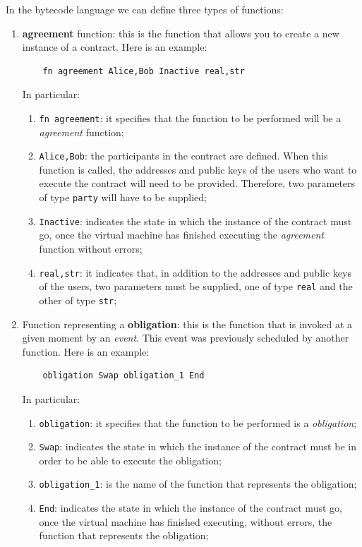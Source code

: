 In the bytecode language we can define three types of functions:
\begin{enumerate}
  \item \textbf{agreement} function: this is the function that allows you to create a new instance of a 
  contract. Here is an example:

  \begin{Verbatim}
    fn agreement Alice,Bob Inactive real,str
  \end{Verbatim}

  In particular:
  \begin{enumerate}
    \item \verb|fn agreement|: it specifies that the function to be performed will be a 
    \textit{agreement} function;
    \item \verb|Alice,Bob|: the participants in the contract are defined. When this function is called, 
    the addresses and public keys of the users who want to execute the contract will need to be provided. 
    Therefore, two parameters of type \verb|party| will have to be supplied;
    \item \verb|Inactive|: indicates the state in which the instance of the contract must go, once the 
    virtual machine has finished executing the \textit{agreement} function without errors;
    \item \verb|real,str|: it indicates that, in addition to the addresses and public keys of the users, 
    two parameters must be supplied, one of type \verb|real| and the other of type \verb|str|;
  \end{enumerate}

  \item Function representing a \textbf{obligation}: this is the function that is invoked at a given 
  moment by an \textit{event}. This event was previously scheduled by another function. Here is an 
  example:

  \begin{Verbatim}
    obligation Swap obligation_1 End
  \end{Verbatim}

  In particular:
  \begin{enumerate}
    \item \verb|obligation|: it specifies that the function to be performed is a \textit{obligation};
    \item \verb|Swap|: indicates the state in which the instance of the contract must be in order to be 
    able to execute the obligation;
    \item \verb|obligation_1|: is the name of the function that represents the obligation;
    \item \verb|End|: indicates the state in which the instance of the contract must go, once the virtual 
    machine has finished executing, without errors, the function that represents the obligation;
  \end{enumerate}
  

\end{enumerate}
